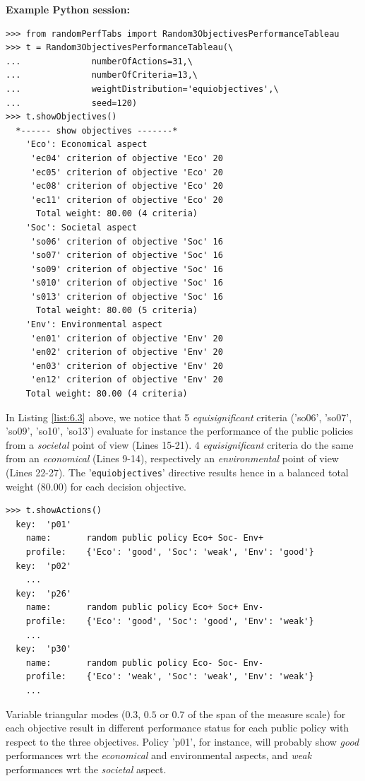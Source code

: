\noindent \textbf{Example Python session:}
\begin{lstlisting}[caption={Generating a random 3 Objectives performance tableau},label=list:6.3]
>>> from randomPerfTabs import Random3ObjectivesPerformanceTableau
>>> t = Random3ObjectivesPerformanceTableau(\
...              numberOfActions=31,\
...              numberOfCriteria=13,\
...              weightDistribution='equiobjectives',\
...              seed=120)
>>> t.showObjectives()
  *------ show objectives -------*
    'Eco': Economical aspect
     'ec04' criterion of objective 'Eco' 20
     'ec05' criterion of objective 'Eco' 20
     'ec08' criterion of objective 'Eco' 20
     'ec11' criterion of objective 'Eco' 20
      Total weight: 80.00 (4 criteria)
    'Soc': Societal aspect
     'so06' criterion of objective 'Soc' 16
     'so07' criterion of objective 'Soc' 16
     'so09' criterion of objective 'Soc' 16
     's010' criterion of objective 'Soc' 16
     's013' criterion of objective 'Soc' 16
      Total weight: 80.00 (5 criteria)
    'Env': Environmental aspect
     'en01' criterion of objective 'Env' 20
     'en02' criterion of objective 'Env' 20
     'en03' criterion of objective 'Env' 20
     'en12' criterion of objective 'Env' 20
    Total weight: 80.00 (4 criteria)
\end{lstlisting}
In Listing \ref{list:6.3} above, we notice that 5 \emph{equisignificant} criteria ('so06', 'so07', 'so09', 'so10', 'so13') evaluate for instance the performance of the public policies from a \emph{societal} point of view (Lines 15-21). 4 \emph{equisignificant} criteria do the same from an \emph{economical} (Lines 9-14), respectively an \emph{environmental} point of view (Lines 22-27). The '\texttt{equiobjectives}' directive results hence in a balanced total weight (80.00) for each decision objective. 
\begin{lstlisting}
>>> t.showActions()
  key:  'p01'
    name:       random public policy Eco+ Soc- Env+
    profile:    {'Eco': 'good', 'Soc': 'weak', 'Env': 'good'}
  key:  'p02'
    ...
  key:  'p26'
    name:       random public policy Eco+ Soc+ Env-
    profile:    {'Eco': 'good', 'Soc': 'good', 'Env': 'weak'}
    ...
  key:  'p30'
    name:       random public policy Eco- Soc- Env-
    profile:    {'Eco': 'weak', 'Soc': 'weak', 'Env': 'weak'}
    ...
 \end{lstlisting}
  
Variable triangular modes ($0.3$, $0.5$ or $0.7$ of the span of the measure scale) for each objective result in different performance status for each public policy with respect to the three objectives. Policy 'p01', for instance, will probably show \emph{good} performances wrt the \emph{economical}  and environmental aspects, and \emph{weak} performances wrt the \emph{societal} aspect.

